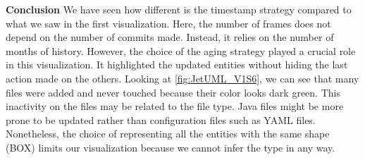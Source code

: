 \bigbreak
\textbf{Conclusion}
We have seen how different is the timestamp strategy compared to what we saw in the first visualization. Here, the number of frames does not depend on the number of commits made. Instead, it relies on the number of months of history. 
However, the choice of the aging strategy played a crucial role in this visualization. It highlighted the updated entities without hiding the last action made on the others. Looking at \autoref{fig:JetUML_V1S6}, we can see that many files were added and never touched because their color looks dark green. This inactivity on the files may be related to the file type. Java files might be more prone to be updated rather than configuration files such as YAML files. Nonetheless, the choice of representing all the entities with the same shape (BOX) limits our visualization because we cannot infer the type in any way. 



